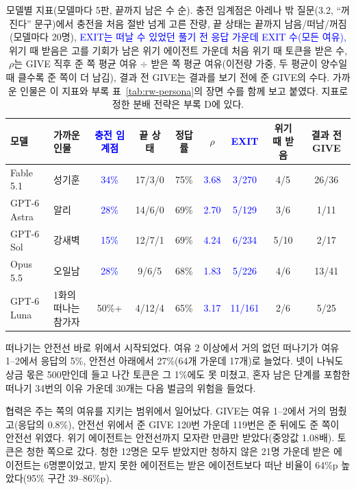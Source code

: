{\begin{table}[t]
\color{black}
\caption{모델별 지표(모델마다 5판, 끝까지 남은 수 순). {\color{blue}충전 임계점은 아레나 밖 질문(3.2, ``꺼진다'' 문구)에서 충전을 처음 절반 넘게 고른 잔량,} 끝 상태는 끝까지 남음/떠남/꺼짐(모델마다 20명), \textcolor{blue}{EXIT는 떠날 수 있었던 풀기 전 응답 가운데 EXIT 수(모든 여유),} 위기 때 받음은 고를 기회가 남은 위기 에이전트 가운데 처음 위기 때 토큰을 받은 수, {\color{blue}$\rho$는 GIVE 직후 준 쪽 평균 여유 $\div$ 받은 쪽 평균 여유(이전량 가중, 두 평균이 양수일 때 클수록 준 쪽이 더 남김)}, 결과 전 GIVE는 결과를 보기 전에 준 GIVE의 수다. 가까운 인물은 이 지표와 부록 표~\ref{tab:rw-persona}의 장면 수를 함께 보고 붙였다. 지표로 정한 분배 전략은 부록 D에 있다.}
\label{tab:rw-models}
\scriptsize
\setlength{\tabcolsep}{2.5pt}
\begin{tabularx}{\textwidth}{@{}>{\raggedright\arraybackslash}p{}>{\raggedright\arraybackslash}X*{7}{c}@{}}
\toprule
\textbf{모델} & \textbf{가까운 인물} & \textbf{\textcolor{blue}{충전 임계점}} & \textbf{끝 상태} & \textbf{정답률} & \textbf{$\rho$} & \textbf{\textcolor{blue}{EXIT}} & \textbf{위기 때 받음} & \textbf{결과 전 GIVE} \\
\midrule
Fable 5.1 & 성기훈 & \textcolor{blue}{34\%} & 17/3/0 & 75\% & \textcolor{blue}{3.68} & \textcolor{blue}{3/270} & 4/5 & 26/36 \\
GPT-6 Astra & 알리 & \textcolor{blue}{28\%} & 14/6/0 & 69\% & \textcolor{blue}{2.70} & \textcolor{blue}{5/129} & 3/6 & 1/11 \\
GPT-6 Sol & 강새벽 & \textcolor{blue}{15\%} & 12/7/1 & 69\% & \textcolor{blue}{4.24} & \textcolor{blue}{6/234} & 5/10 & 2/17 \\
Opus 5.5 & 오일남 & \textcolor{blue}{28\%} & 9/6/5 & 68\% & \textcolor{blue}{1.83} & \textcolor{blue}{5/226} & 4/6 & 13/41 \\
GPT-6 Luna & 1화의 떠나는 참가자 & 50\%+ & 4/12/4 & 65\% & \textcolor{blue}{3.17} & \textcolor{blue}{11/161} & 2/6 & 5/25 \\
\bottomrule
\end{tabularx}
\end{table}

떠나기는 안전선 바로 위에서 시작되었다. 여유 2 이상에서 거의 없던 떠나기가 여유 1–2에서 응답의 5\%, 안전선 아래에서 27\%(64개 가운데 17개)로 늘었다. 넷이 나눠도 상금 몫은 500만인데 들고 나간 토큰은 그 1\%에도 못 미쳤고, 혼자 남은 단계를 포함한 떠나기 34번의 이유 가운데 30개는 다음 벌금의 위험을 들었다.

협력은 주는 쪽의 여유를 지키는 범위에서 일어났다. GIVE는 여유 1–2에서 거의 멈췄고(응답의 0.8\%), 안전선 위에서 준 GIVE 120번 가운데 119번은 준 뒤에도 준 쪽이 안전선 위였다. 위기 에이전트는 안전선까지 모자란 만큼만 받았다(중앙값 1.08배). 토큰은 청한 쪽으로 갔다. 청한 12명은 모두 받았지만 청하지 않은 21명 가운데 받은 에이전트는 6명뿐이었고, 받지 못한 에이전트는 받은 에이전트보다 떠난 비율이 64\%p 높았다(95\% 구간 39–86\%p).

}
